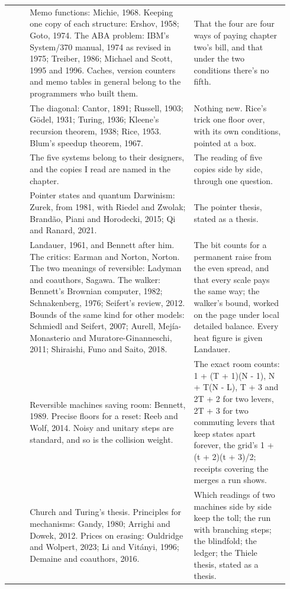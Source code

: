\documentclass[11pt,twoside]{article}
\theoremstyle{thielethm}
\theoremstyle{thieledef}
\theoremstyle{thieledef}
\theoremstyle{thieledef}
\theoremstyle{thielethm}
\theoremstyle{thieleobs}
\theoremstyle{thielethm}
\begin{document}
\begin{longtable}{@{}>{\raggedright\arraybackslash}p{0.07\linewidth}>{\raggedright\arraybackslash}p{0.55\linewidth}>{\raggedright\arraybackslash}p{0.32\linewidth}@{}}
16 & Memo functions: Michie, 1968. Keeping one copy of each structure: Ershov, 1958; Goto, 1974. The ABA problem: IBM's System/370 manual, 1974 as revised in 1975; Treiber, 1986; Michael and Scott, 1995 and 1996. Caches, version counters and memo tables in general belong to the programmers who built them. & That the four are four ways of paying chapter two's bill, and that under the two conditions there's no fifth. \\
17 & The diagonal: Cantor, 1891; Russell, 1903; G\"odel, 1931; Turing, 1936; Kleene's recursion theorem, 1938; Rice, 1953. Blum's speedup theorem, 1967. & Nothing new. Rice's trick one floor over, with its own conditions, pointed at a box. \\
18 & The five systems belong to their designers, and the copies I read are named in the chapter. & The reading of five copies side by side, through one question. \\
19 & Pointer states and quantum Darwinism: Zurek, from 1981, with Riedel and Zwolak; Brand\~ao, Piani and Horodecki, 2015; Qi and Ranard, 2021. & The pointer thesis, stated as a thesis. \\
20 & Landauer, 1961, and Bennett after him. The critics: Earman and Norton, Norton. The two meanings of reversible: Ladyman and coauthors, Sagawa. The walker: Bennett's Brownian computer, 1982; Schnakenberg, 1976; Seifert's review, 2012. Bounds of the same kind for other models: Schmiedl and Seifert, 2007; Aurell, Mej\'ia-Monasterio and Muratore-Ginanneschi, 2011; Shiraishi, Funo and Saito, 2018. & The bit counts for a permanent raise from the even spread, and that every scale pays the same way; the walker's bound, worked on the page under local detailed balance. Every heat figure is given Landauer. \\
21 & Reversible machines saving room: Bennett, 1989. Precise floors for a reset: Reeb and Wolf, 2014. Noisy and unitary steps are standard, and so is the collision weight. & The exact room counts: 1 + (T + 1)(N - 1), N + T(N - L), T + 3 and 2T + 2 for two levers, 2T + 3 for two commuting levers that keep states apart forever, the grid's 1 + (t + 2)(t + 3)/2; receipts covering the merges a run shows. \\
22 & Church and Turing's thesis. Principles for mechanisms: Gandy, 1980; Arrighi and Dowek, 2012. Prices on erasing: Ouldridge and Wolpert, 2023; Li and Vit\'anyi, 1996; Demaine and coauthors, 2016. & Which readings of two machines side by side keep the toll; the run with branching steps; the blindfold; the ledger; the Thiele thesis, stated as a thesis. \\
\end{longtable}
\endgroup
\end{document}
